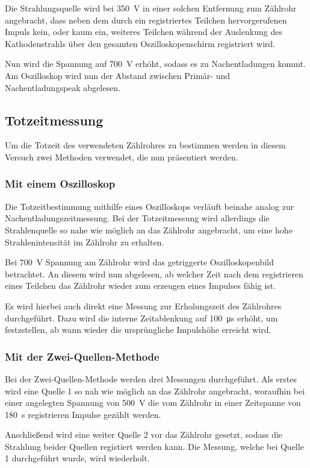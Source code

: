 Die Strahlungsquelle wird bei \SI{350}{\volt} in einer solchen
Entfernung zum Zählrohr angebracht, dass neben dem durch ein
registriertes Teilchen hervorgerufenen Impuls kein, oder kaum ein,
weiteres Teilchen während der Auslenkung des Kathodenstrahls über den
gesamten Oszilloskopenschirm registriert wird.

Nun wird die Spannung auf \SI{700}{\volt} erhöht, sodass es zu
Nachentladungen kommt.  Am Oszilloskop wird nun der Abstand zwischen
Primär- und Nachentladungspeak abgelesen.
%
\subsection{Totzeitmessung}
Um die Totzeit des verwendeten Zählrohres zu bestimmen werden in diesem
Versuch zwei Methoden verwendet, die nun präsentiert werden.
\subsubsection{Mit einem Oszilloskop}
%
Die Totzeitbestimmung mithilfe eines Oszilloskops verläuft beinahe
analog zur Nachentladungszeitmessung. Bei der Totzeitmessung wird
allerdings die Strahlenquelle so nahe wie möglich an das Zählrohr
angebracht, um eine hohe Strahlenintensität im Zählrohr zu erhalten.

Bei \SI{700}{\volt} Spannung am Zählrohr wird das getriggerte
Oszilloskopenbild betrachtet. An diesem wird nun abgelesen, ab welcher
Zeit nach dem registrieren eines Teilchen das Zählrohr wieder zum
erzeugen eines Impulses fähig ist.

Es wird hierbei auch direkt eine Messung zur Erholungszeit des
Zählrohres durchgeführt.  Dazu wird die interne Zeitablenkung auf
\SI{100}{\micro\second} erhöht, um festzstellen, ab wann wieder die
ursprüngliche Impulshöhe erreicht wird.
%
\subsubsection{Mit der Zwei-Quellen-Methode}
%
Bei der Zwei-Quellen-Methode werden drei Messungen durchgeführt.  Als
erstes wird eine Quelle 1 so nah wie möglich an das Zählrohr angebracht,
woraufhin bei einer angelegten Spannung von \SI{500}{\volt} die vom
Zählrohr in einer Zeitspanne von \SI{180}{\second} registrieren Impulse
gezählt werden.

Anschließend wird eine weiter Quelle 2 vor das Zählrohr gesetzt, sodass
die Strahlung beider Quellen registiert werden kann. Die Messung, welche
bei Quelle 1 durchgeführt wurde, wird wiederholt.

